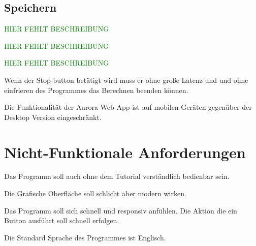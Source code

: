 \documentclass[parskip=full,11pt,twoside]{scrartcl}
\begin{document}

\subsection{Speichern}
\textcolor{green}{HIER FEHLT BESCHREIBUNG}

\textcolor{green}{HIER FEHLT BESCHREIBUNG}

\textcolor{green}{HIER FEHLT BESCHREIBUNG}

Wenn der Stop-button betätigt wird muss er ohne große Latenz und und ohne einfrieren des Programmes das Berechnen beenden können.


Die Funktionalität der Aurora Web App ist auf mobilen Geräten gegenüber der Desktop Version eingeschränkt.




\section{Nicht-Funktionale Anforderungen}

Das Programm soll auch ohne dem Tutorial verständlich bedienbar sein.

Die Grafische Oberfläche soll schlicht aber modern wirken. 

Das Programm soll sich schnell und responsiv anfühlen. Die Aktion die ein Button ausführt soll schnell erfolgen. 

Die Standard Sprache des Programmes ist Englisch.
\end{document}
